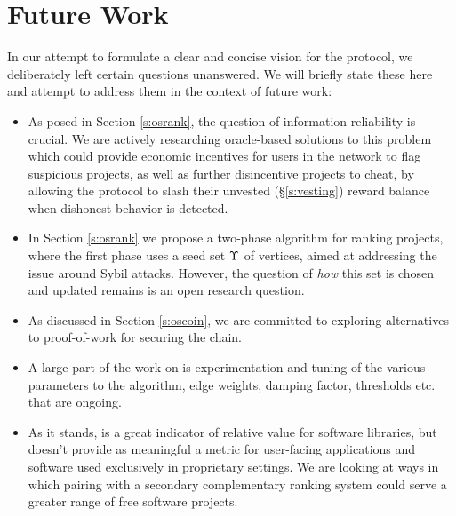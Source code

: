 \section{Future Work}
\label{s:future-work}

In our attempt to formulate a clear and concise vision for the \oscoin{}
protocol, we deliberately left certain questions unanswered. We will
briefly state these here and attempt to address them in the context of future work:

\begin{itemize}
\item As posed in Section \ref{s:osrank}, the question of information
reliability is crucial.  We are actively researching oracle-based solutions to
this problem which could provide economic incentives for users in the network
to flag suspicious projects, as well as further disincentive projects to cheat,
by allowing the protocol to slash their unvested (\S\ref{s:vesting}) reward
balance when dishonest behavior is detected.

\item In Section \ref{s:osrank} we propose a two-phase \osrank{} algorithm for
ranking projects, where the first phase uses a seed set $\Upsilon$ of vertices,
aimed at addressing the issue around Sybil attacks.  However, the question of
\emph{how} this set is chosen and updated remains is an open research question.

\item As discussed in Section \ref{s:oscoin}, we are committed to exploring
alternatives to proof-of-work for securing the chain.

\item A large part of the work on \osrank{} is experimentation and tuning of the
various parameters to the algorithm, \eg edge weights, damping factor, thresholds
etc. that are ongoing.

\item As it stands, \osrank{} is a great indicator of relative value
for software libraries, but doesn't provide as meaningful a metric for
user-facing applications and software used exclusively in proprietary settings.
We are looking at ways in which pairing \osrank{} with a secondary complementary
ranking system could serve a greater range of free software projects.

\end{itemize}
